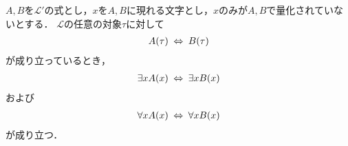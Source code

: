 	\begin{screen}
		\begin{logicalthm}[量化記号の性質(イ)]\label{logicalthm:properties_of_quantifiers}
			$A,B$を$\mathcal{L}'$の式とし，$x$を$A,B$に現れる文字とし，$x$のみが$A,B$で量化されていないとする．
			$\mathcal{L}$の任意の対象$\tau$に対して
			\begin{align}
				A(\tau) \hspace{0.25em}\Leftrightarrow\hspace{0.25em} B(\tau)
			\end{align}
			が成り立っているとき，
			\begin{align}
				\exists x A(x) \hspace{0.25em}\Leftrightarrow\hspace{0.25em} \exists x B(x)
			\end{align}
			および
			\begin{align}
				\forall x A(x) \hspace{0.25em}\Leftrightarrow\hspace{0.25em} \forall x B(x)
			\end{align}
			が成り立つ．
		\end{logicalthm}
	\end{screen}
	
